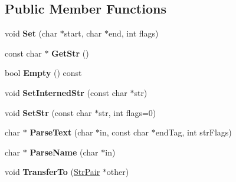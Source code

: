 \subsection*{Public Member Functions}
\begin{DoxyCompactItemize}
\item 
void {\bfseries Set} (char $\ast$start, char $\ast$end, int flags)\hypertarget{classtinyxml2_1_1_str_pair_a4f05549373394266a1eecba26813c166}{}\label{classtinyxml2_1_1_str_pair_a4f05549373394266a1eecba26813c166}

\item 
const char $\ast$ {\bfseries Get\+Str} ()\hypertarget{classtinyxml2_1_1_str_pair_a27290a8fec20c0a6ccf9d8362f5c3b1d}{}\label{classtinyxml2_1_1_str_pair_a27290a8fec20c0a6ccf9d8362f5c3b1d}

\item 
bool {\bfseries Empty} () const \hypertarget{classtinyxml2_1_1_str_pair_affa1043e73a18f05d5d2faec055725a7}{}\label{classtinyxml2_1_1_str_pair_affa1043e73a18f05d5d2faec055725a7}

\item 
void {\bfseries Set\+Interned\+Str} (const char $\ast$str)\hypertarget{classtinyxml2_1_1_str_pair_a2baf6230e18333e02ab65d0897ee3941}{}\label{classtinyxml2_1_1_str_pair_a2baf6230e18333e02ab65d0897ee3941}

\item 
void {\bfseries Set\+Str} (const char $\ast$str, int flags=0)\hypertarget{classtinyxml2_1_1_str_pair_a1f82ec6b5bee35ee7466d8565e43b1de}{}\label{classtinyxml2_1_1_str_pair_a1f82ec6b5bee35ee7466d8565e43b1de}

\item 
char $\ast$ {\bfseries Parse\+Text} (char $\ast$in, const char $\ast$end\+Tag, int str\+Flags)\hypertarget{classtinyxml2_1_1_str_pair_a7ff60a4aaea3ad696e940ecd31806a29}{}\label{classtinyxml2_1_1_str_pair_a7ff60a4aaea3ad696e940ecd31806a29}

\item 
char $\ast$ {\bfseries Parse\+Name} (char $\ast$in)\hypertarget{classtinyxml2_1_1_str_pair_a8452c0c7f140d4d613134e952ce54f14}{}\label{classtinyxml2_1_1_str_pair_a8452c0c7f140d4d613134e952ce54f14}

\item 
void {\bfseries Transfer\+To} (\hyperlink{classtinyxml2_1_1_str_pair}{Str\+Pair} $\ast$other)\hypertarget{classtinyxml2_1_1_str_pair_a35f795b1557fe5fdcbd93d3cc5d6b939}{}\label{classtinyxml2_1_1_str_pair_a35f795b1557fe5fdcbd93d3cc5d6b939}

\end{DoxyCompactItemize}
